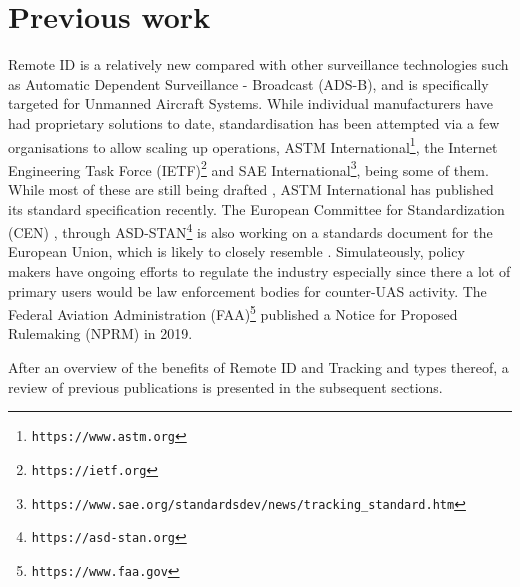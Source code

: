 \documentclass{ua_wgs_base}
\begin{document}
\section{Previous work}

Remote ID is a relatively new compared with other surveillance technologies
such as Automatic Dependent Surveillance - Broadcast (ADS-B),
and is specifically targeted for Unmanned Aircraft Systems. While
individual manufacturers have had proprietary solutions to date, standardisation
has been attempted via a few organisations to allow scaling up operations,
ASTM International\footnote{\texttt{https://www.astm.org}}, the Internet
Engineering Task Force (IETF)\footnote{\texttt{https://ietf.org}}
and SAE International\footnote{\texttt{https://www.sae.org/standardsdev/news/tracking\_standard.htm}},
being some of them. While most of these are still being drafted \cite{IETF-DRIP-arch-draft,IETF-DRIP-reqs-draft,IETF-crowd-sourced-rid-draft,IETF-uas-rid-draft,IETF-drip-identity-draft,IETF-drip-operator-privacy-draft,IETF-drip-secure-transport-draft,IETF-drip-auth-draft},
ASTM International has published its standard specification\cite{ASTM:F3411:19}
recently. The European Committee for Standardization (CEN) ,
through ASD-STAN\footnote{\texttt{https://asd-stan.org}} is also
working on a standards document for the European Union, which is likely
to closely resemble \cite{ASTM:F3411:19}. Simulateously, policy makers
have ongoing efforts to regulate the industry especially since there
a lot of primary users would be law enforcement bodies for counter-UAS
activity. The Federal Aviation Administration (FAA)\footnote{\texttt{https://www.faa.gov}}
published a Notice for Proposed Rulemaking (NPRM)\cite{FAA-NPRM-2019-1100}
in 2019. 

After an overview of the benefits of Remote ID and Tracking and types
thereof, a review of previous publications is presented in the subsequent
sections.
\end{document}
